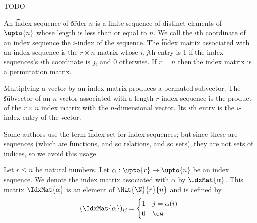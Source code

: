 
\sbasic

































\sstart
{}


TODO


An \t{index sequence} of \t{order} $n$ is a finite sequence of distinct elements of $\upto{n}$ whose length is less than or equal to $n$.
We call the $i$th coordinate of an index sequence the \t{$i$-index} of the sequence.
The \t{index matrix} associated with an index sequence is the $r \times n$ matrix whose $i,j$th entry is 1 if the index sequences's $i$th coordinate is $j$, and $0$ otherwise.
If $r = n$ then the index matrix is a permutation matrix.

Multiplying a vector by an index matrix produces a permuted subvector.
The \t{subvector} of an $n$-vector {associated with} a length-$r$ index sequence is the product of the $r \times n$ index matrix with the $n$-dimensional vector.
Its $i$th entry is the $i$-index entry of the vector.

Some authors use the term \t{index set} for index sequences; but since these are sequences (which are functions, and so relations, and so sets), they are not sets of indices, so we avoid this usage.


Let $r \leq n$ be natural numbers.
Let $\alpha: \upto{r} \to \upto{n}$ be an index sequence.
We denote the index matrix associated with $\alpha$ by $\IdxMat{\alpha}$.
This matrix $\IdxMat{\alpha}$ is an element of $\Mat{\N}{r}{n}$ and is defined by
$$
    (\IdxMat{\alpha})_{ij} = \begin{cases}
    1 & j = \alpha(i) \\
    0 & \ow
  \end{cases}
$$


